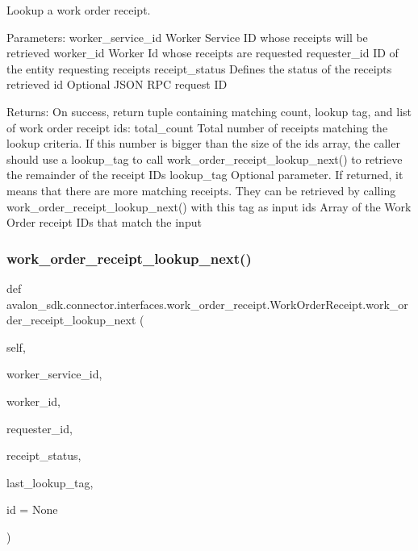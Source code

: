 \begin{DoxyVerb}Lookup a work order receipt.

Parameters:
worker_service_id Worker Service ID whose receipts will be
          retrieved
worker_id         Worker Id whose receipts are requested
requester_id      ID of the entity requesting receipts
receipt_status    Defines the status of the receipts retrieved
id                Optional JSON RPC request ID

Returns:
On success, return tuple containing matching count, lookup tag,
and list of work order receipt ids:
total_count   Total number of receipts matching the lookup
      criteria. If this number is bigger than the size
      of the ids array, the caller should use a lookup_tag
      to call work_order_receipt_lookup_next() to retrieve
      the remainder of the receipt IDs
lookup_tag    Optional parameter. If returned, it means that
      there are more matching receipts. They can be retrieved
      by calling work_order_receipt_lookup_next() with
      this tag as input
ids           Array of the Work Order receipt IDs that match the input\end{DoxyVerb}
 \mbox{\label{classavalon__sdk_1_1connector_1_1interfaces_1_1work__order__receipt_1_1WorkOrderReceipt_a894e2753ff5991c72a0c351c010cd093}} 
\subsubsection{\texorpdfstring{work\+\_\+order\+\_\+receipt\+\_\+lookup\+\_\+next()}{work\_order\_receipt\_lookup\_next()}}
{\footnotesize\ttfamily def avalon\+\_\+sdk.\+connector.\+interfaces.\+work\+\_\+order\+\_\+receipt.\+Work\+Order\+Receipt.\+work\+\_\+order\+\_\+receipt\+\_\+lookup\+\_\+next (\begin{DoxyParamCaption}\item[{}]{self,  }\item[{}]{worker\+\_\+service\+\_\+id,  }\item[{}]{worker\+\_\+id,  }\item[{}]{requester\+\_\+id,  }\item[{}]{receipt\+\_\+status,  }\item[{}]{last\+\_\+lookup\+\_\+tag,  }\item[{}]{id = {\ttfamily None} }\end{DoxyParamCaption})}

